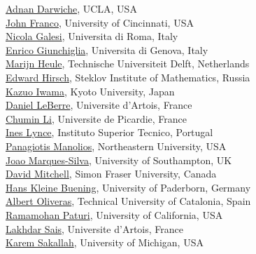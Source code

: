 \documentclass[10pt]{article}
\begin{document}
\begin{minipage}[t]{7.5cm}
{          \href{http://www.cs.ucla.edu/~darwiche/}{Adnan Darwiche}, UCLA, USA \\
          \href{http://www.ececs.uc.edu/~franco/}{John Franco}, University of Cincinnati, USA  \\
          \href{http://www.dsi.uniroma1.it/~galesi/}{Nicola Galesi}, Universita di Roma, Italy  \\
          \href{http://www.star.dist.unige.it/index.php?option=com_uhp2&task=viewpage&item_id=50&user_id=74}{Enrico Giunchiglia}, Universita di Genova, Italy \\
          \href{http://www.st.ewi.tudelft.nl/~marijn/}{Marijn Heule}, Technische Universiteit Delft, Netherlands \\
          \href{http://logic.pdmi.ras.ru/~hirsch/}{Edward Hirsch}, Steklov Institute of Mathematics, Russia  \\
          \href{http://www.lab2.kuis.kyoto-u.ac.jp/~iwama/}{Kazuo Iwama}, Kyoto University, Japan  \\
          \href{http://www.cril.univ-artois.fr/~leberre/}{Daniel LeBerre}, Universite d'Artois, France  \\
          \href{http://www.laria.u-picardie.fr/~cli/}{Chumin Li}, Universite de Picardie, France  \\
          \href{http://sat.inesc-id.pt/~ines/}{Ines Lynce}, Instituto Superior Tecnico, Portugal \\
          \href{http://www.ccs.neu.edu/home/pete}{Panagiotis Manolios}, Northeastern University, USA  \\
          \href{http://users.ecs.soton.ac.uk/jpms/}{Joao Marques-Silva}, University of Southampton, UK  \\
          \href{http://www.cs.sfu.ca/~mitchell/}{David Mitchell}, Simon Fraser University, Canada  \\
          \href{http://wwwcs.uni-paderborn.de/cs/ag-klbue/en/staff/kbcsl/index.html}{Hans Kleine Buening}, University of Paderborn, Germany  \\
          \href{http://www.lsi.upc.edu/~oliveras/}{Albert Oliveras}, Technical University of Catalonia, Spain  \\
          \href{http://www-cse.ucsd.edu/~paturi/}{Ramamohan Paturi}, University of California, USA  \\
          \href{http://www.cril.univ-artois.fr/~sais/}{Lakhdar Sais}, Universite d'Artois, France  \\
          \href{http://www.eecs.umich.edu/~karem/}{Karem Sakallah}, University of Michigan, USA  \\
}
\end{minipage}
\end{document}
